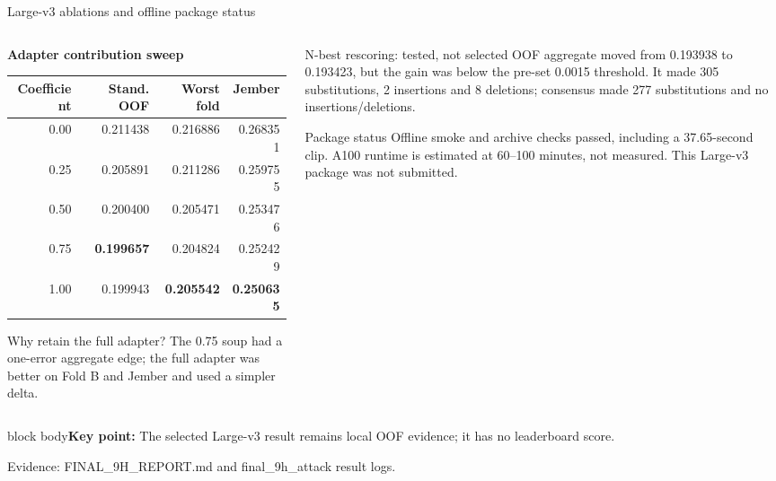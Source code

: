 \documentclass[aspectratio=169,11pt]{beamer}
\newcommand{\takeaway}[1]{\vfill\begin{beamercolorbox}[sep=2mm,wd=\linewidth]{block body}\small\textbf{Key point:} #1\end{beamercolorbox}}
\newcommand{\evidence}[1]{\vspace{1mm}\par{\tiny\color{slate}Evidence: #1\par}}
\begin{document}
\begin{frame}{Large-v3 ablations and offline package status}
\begin{columns}[T]
\begin{column}{0.49\textwidth}
\small
\textbf{Adapter contribution sweep}
\vspace{1mm}
\begin{tabular}{@{}rrrr@{}}\toprule
\textbf{Coefficient}&\textbf{Stand. OOF}&\textbf{Worst fold}&\textbf{Jember}\\\midrule
0.00&0.211438&0.216886&0.268351\\
0.25&0.205891&0.211286&0.259755\\
0.50&0.200400&0.205471&0.253476\\
0.75&\textbf{0.199657}&0.204824&0.252429\\
1.00&0.199943&\textbf{0.205542}&\textbf{0.250635}\\\bottomrule
\end{tabular}
\vspace{2mm}
\begin{block}{Why retain the full adapter?}
\small The 0.75 soup had a one-error aggregate edge; the full adapter was better on Fold B and Jember and used a simpler delta.
\end{block}
\end{column}
\begin{column}{0.47\textwidth}
\begin{alertblock}{N-best rescoring: tested, not selected}
\small OOF aggregate moved from 0.193938 to 0.193423, but the gain was below the pre-set 0.0015 threshold. It made 305 substitutions, 2 insertions and 8 deletions; consensus made 277 substitutions and no insertions/deletions.
\end{alertblock}
\begin{block}{Package status}
\small Offline smoke and archive checks passed, including a 37.65-second clip. A100 runtime is estimated at 60--100 minutes, not measured. This Large-v3 package was not submitted.
\end{block}
\end{column}
\end{columns}
\takeaway{The selected Large-v3 result remains local OOF evidence; it has no leaderboard score.}
\evidence{FINAL\_9H\_REPORT.md and final\_9h\_attack result logs.}
\end{frame}
\end{document}
